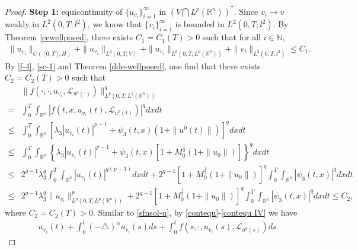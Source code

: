 \documentclass[10pt,a4paper]{amsart}
\def\leq{\leqslant}
\begin{document}
\begin{proof}
    {\bf Step 1:}   equicontinuity of $\{ u_{v_i} \}_{i=1}^\infty$
    in $\left( V \bigcap L^p(\mathbb{R}^n) \right)^\ast$.
    Since $v_i \rightarrow v$ weakly in $L^2(0, T; l^2)$,
    we know  that $\{ v_i \}_{i=1}^\infty$ is bounded in $L^2(0,T; l^2)$.
    By Theorem \ref{cewellposed}, there exists $C_1 = C_1(T) > 0$ such
    that for all $i \in \mathbb{N}$,
    \begin{align}\label{sc-1}
        \| u_{v_i} \|_{C([0,T],H)}
        + \| u_{v_i} \|_{L^2(0,T; V)}
        + \| u_{v_i} \|_{L^p(0,T;L^p(\mathbb{R}^n))}
        + \| v_i \|_{L^2(0,T; l^2)}
        \leq C_1.
    \end{align}
    By \eqref{f-4},
    \eqref{sc-1} and Theorem \ref{dde-wellposed},
    one
    find that there exists $C_2 = C_2(T) > 0$ such that
    \begin{align} \label{sc-2}
        & \| f(\cdot, \cdot, u_{v_i}, \mathcal{L}_{u^0(\cdot)} ) \|_{L^q(0,T;L^q(\mathbb{R}^n) ) }^q
        \nonumber \\
        = & \int_0^T \int_{\mathbb{R}^n}
        \left| f(t,x, u_{v_i}(t), \mathcal{L}_{u^0(t)} )
        \right|^q dx dt
        \nonumber \\
        \leq & \int_0^T \int_{\mathbb{R}^n}
        \left[ \lambda_3 |u_{v_i}(t)|^{p-1} + \psi_3(t,x) \left( 1 + \|u^0(t)\| \right)
        \right]^q dx dt
        \nonumber \\
        \leq & \int_0^T \int_{\mathbb{R}^n}
        \left\{ \lambda_3 |u_{v_i}(t)|^{p-1}
        + \psi_3(t,x)
        \left[ 1 + M_0^{\frac 12} (1 + \|u_0\|)
        \right]
        \right\}^q dx dt
        \nonumber \\
        \leq & 2^{q-1} \lambda_3^q
        \int_0^T \int_{\mathbb{R}^n} |u_{v_i}(t)|^{q(p-1)} dx dt
        + 2^{q-1}
        \left[ 1 + M_0^{\frac 12}(1 + \|u_0\|)
        \right]^q
        \int_0^T \int_{\mathbb{R}^n} |\psi_3(t,x)|^q dx dt
        \nonumber \\
        \leq & 2^{q-1} \lambda_3^q \|u_{v_i}\|_{L^p(0,T;L^p(\mathbb{R}^n) ) }^p
        + 2^{q-1}
        \left[ 1 + M_0^{\frac 12}(1 + \|u_0\|)
        \right]^q
        \int_0^T \int_{\mathbb{R}^n} |\psi_3(t,x)|^q dx dt
        \le  C_2,
    \end{align}
    where $C_2=C_2(T)>0$.
    Similar to \eqref{sfnsol-u},
    by \eqref{contequ}-\eqref{contequ IV}
    we have
    \begin{align} \label{sc-3}
        & u_{v_i} (t)
        + \int_0^t (-\triangle)^{\alpha} u_{v_i}(s) ds
        + \int_0^t f( s, \cdot, u_{v_i}(s), \mathcal{L}_{u^0(s)} ) ds

\end{align}
\end{proof}
\end{document}
